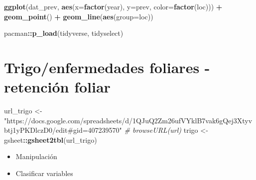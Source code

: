 \documentclass[]{book}
\newenvironment{Shaded}{\begin{snugshade}}{\end{snugshade}}
\newcommand{\CommentTok}[1]{\textcolor[rgb]{0.56,0.35,0.01}{\textit{#1}}}
\newcommand{\DataTypeTok}[1]{\textcolor[rgb]{0.13,0.29,0.53}{#1}}
\newcommand{\KeywordTok}[1]{\textcolor[rgb]{0.13,0.29,0.53}{\textbf{#1}}}
\newcommand{\NormalTok}[1]{#1}
\newcommand{\OperatorTok}[1]{\textcolor[rgb]{0.81,0.36,0.00}{\textbf{#1}}}
\newcommand{\StringTok}[1]{\textcolor[rgb]{0.31,0.60,0.02}{#1}}
\begin{document}
\begin{Shaded}
\begin{Highlighting}[]
\KeywordTok{ggplot}\NormalTok{(dat_prev, }\KeywordTok{aes}\NormalTok{(}\DataTypeTok{x=}\KeywordTok{factor}\NormalTok{(year), }\DataTypeTok{y=}\NormalTok{prev, }\DataTypeTok{color=}\KeywordTok{factor}\NormalTok{(loc))) }\OperatorTok{+}
\StringTok{  }\KeywordTok{geom_point}\NormalTok{() }\OperatorTok{+}
\StringTok{  }\KeywordTok{geom_line}\NormalTok{(}\KeywordTok{aes}\NormalTok{(}\DataTypeTok{group=}\NormalTok{loc))}
\end{Highlighting}
\end{Shaded}

\begin{Shaded}
\begin{Highlighting}[]
\NormalTok{pacman}\OperatorTok{::}\KeywordTok{p_load}\NormalTok{(tidyverse, tidyselect)}
\end{Highlighting}
\end{Shaded}

\hypertarget{trigoenfermedades-foliares---retenciuxf3n-foliar}{%
\chapter{Trigo/enfermedades foliares - retención
foliar}\label{trigoenfermedades-foliares---retenciuxf3n-foliar}}

\begin{Shaded}
\begin{Highlighting}[]
\NormalTok{url_trigo <-}\StringTok{ "https://docs.google.com/spreadsheets/d/1QJuQ2Zm26ufVYklB7vak6gQej3Xtyvbtj1yPKDlczD0/edit#gid=407239570"}
\CommentTok{# browseURL(url)}
\NormalTok{trigo <-}\StringTok{ }\NormalTok{gsheet}\OperatorTok{::}\KeywordTok{gsheet2tbl}\NormalTok{(url_trigo)}
\end{Highlighting}
\end{Shaded}

\begin{itemize}
\item
  Manipulación
\item
  Clasificar variables
\end{itemize}

\begin{Shaded}
\end{Shaded}
\end{document}
